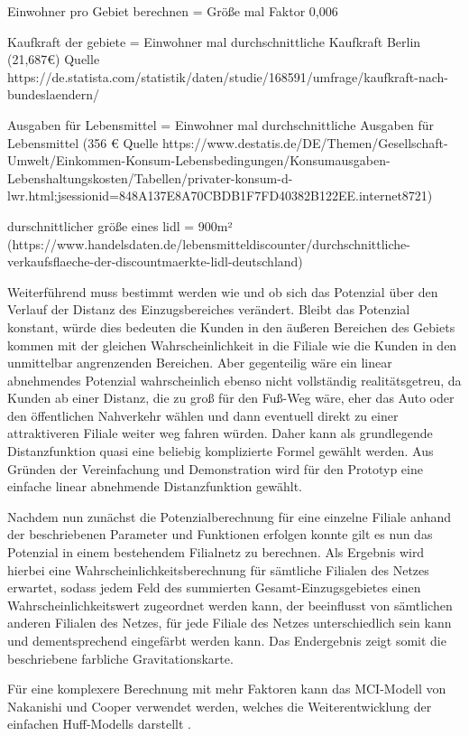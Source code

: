 Einwohner pro Gebiet berechnen = Größe mal Faktor 0,006

Kaufkraft der gebiete = Einwohner mal durchschnittliche Kaufkraft Berlin (21,687€) Quelle https://de.statista.com/statistik/daten/studie/168591/umfrage/kaufkraft-nach-bundeslaendern/

Ausgaben für Lebensmittel = Einwohner mal durchschnittliche Ausgaben für Lebensmittel (356 € Quelle https://www.destatis.de/DE/Themen/Gesellschaft-Umwelt/Einkommen-Konsum-Lebensbedingungen/Konsumausgaben-Lebenshaltungskosten/Tabellen/privater-konsum-d-lwr.html;jsessionid=848A137E8A70CBDB1F7FD40382B122EE.internet8721)

durschnittlicher größe eines lidl = 900m² (https://www.handelsdaten.de/lebensmitteldiscounter/durchschnittliche-verkaufsflaeche-der-discountmaerkte-lidl-deutschland)


Weiterführend muss bestimmt werden wie und ob sich das Potenzial über den Verlauf der Distanz des Einzugsbereiches verändert.
Bleibt das Potenzial konstant, würde dies bedeuten die Kunden in den äußeren Bereichen des Gebiets kommen mit der gleichen Wahrscheinlichkeit in die Filiale wie die Kunden in den unmittelbar angrenzenden Bereichen.
Aber gegenteilig wäre ein linear abnehmendes Potenzial wahrscheinlich ebenso nicht vollständig realitätsgetreu, da Kunden ab einer Distanz, die zu groß für den Fuß-Weg wäre, eher das Auto oder den öffentlichen Nahverkehr wählen und dann eventuell direkt zu einer attraktiveren Filiale weiter weg fahren würden. 
Daher kann als grundlegende Distanzfunktion quasi eine beliebig komplizierte Formel gewählt werden.
Aus Gründen der Vereinfachung und Demonstration wird für den Prototyp eine einfache linear abnehmende Distanzfunktion gewählt.

Nachdem nun zunächst die Potenzialberechnung für eine einzelne Filiale anhand der beschriebenen Parameter und Funktionen erfolgen konnte gilt es nun das Potenzial in einem bestehendem Filialnetz zu berechnen.
Als Ergebnis wird hierbei eine Wahrscheinlichkeitsberechnung für sämtliche Filialen des Netzes erwartet, sodass jedem Feld des summierten Gesamt-Einzugsgebietes einen Wahrscheinlichkeitswert zugeordnet werden kann, der beeinflusst von sämtlichen anderen Filialen des Netzes, für jede Filiale des Netzes unterschiedlich sein kann und dementsprechend eingefärbt werden kann.
Das Endergebnis zeigt somit die beschriebene farbliche Gravitationskarte.

Für eine komplexere Berechnung mit mehr Faktoren kann das MCI-Modell von Nakanishi und Cooper verwendet werden, welches die Weiterentwicklung der einfachen Huff-Modells darstellt \cite{mciModell}.
\newpage

